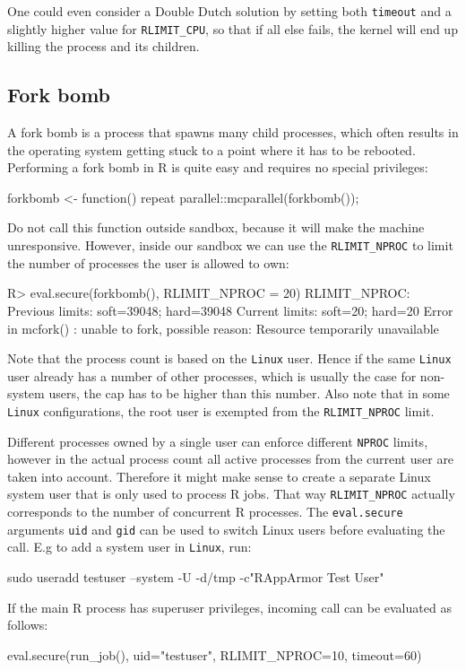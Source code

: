 \documentclass[article]{jss}
\newcommand{\R}{\textsf{R}\xspace}
\newcommand{\Linux}{\texttt{Linux}\xspace}
\begin{document}
\begin{appendices}
One could even consider a Double Dutch solution by setting both \texttt{timeout}
and a slightly higher value for \texttt{RLIMIT\_CPU}, so that if all else fails,
the kernel will end up killing the process and its children.

\subsection{Fork bomb}

A fork bomb is a process that spawns many child processes, which often results
in the operating system getting stuck to a point where it has to be rebooted.
Performing a fork bomb in \R is quite easy and requires no special privileges:
\begin{CodeChunk}
\begin{CodeInput}
forkbomb <- function(){
  repeat{
    parallel::mcparallel(forkbomb());
  }
}
\end{CodeInput}
\end{CodeChunk}
Do not call this function outside sandbox, because it will make the machine
unresponsive. However, inside our sandbox we can use the \texttt{RLIMIT\_NPROC}
to limit the number of processes the user is allowed to own:
\begin{CodeChunk}
\begin{CodeInput}
R> eval.secure(forkbomb(), RLIMIT_NPROC = 20)
RLIMIT_NPROC:
Previous limits: soft=39048; hard=39048
Current limits: soft=20; hard=20
Error in mcfork() :
  unable to fork, possible reason: Resource temporarily unavailable
\end{CodeInput}
\end{CodeChunk}
Note that the process count is based on the \Linux user. Hence if the same
\Linux user already has a number of other processes, which is usually the case for
non-system users, the cap has to be higher than this number. Also note
that in some \Linux configurations, the root user is exempted from the
\texttt{RLIMIT\_NPROC} limit.

Different processes owned by a single user can enforce different \texttt{NPROC}
limits, however in the actual process count all active processes from the
current user are taken into account. Therefore it might make sense to create a
separate Linux system user that is only used to process \R jobs. That way
\texttt{RLIMIT\_NPROC} actually corresponds to the number of concurrent \R
processes. The \texttt{eval.secure} arguments \texttt{uid} and \texttt{gid}
can be used to switch Linux users before evaluating the call. E.g to add a
system user in \Linux, run:
\begin{CodeChunk}
\begin{CodeInput}
sudo useradd testuser --system -U -d/tmp -c"RAppArmor Test User"
\end{CodeInput}
\end{CodeChunk}
If the main \R process has superuser privileges, incoming call can be
evaluated as follows:
\begin{CodeChunk}
\begin{CodeInput}
eval.secure(run_job(), uid="testuser", RLIMIT_NPROC=10, timeout=60)
\end{CodeInput}
\end{CodeChunk}



\end{appendices}
\end{document}

